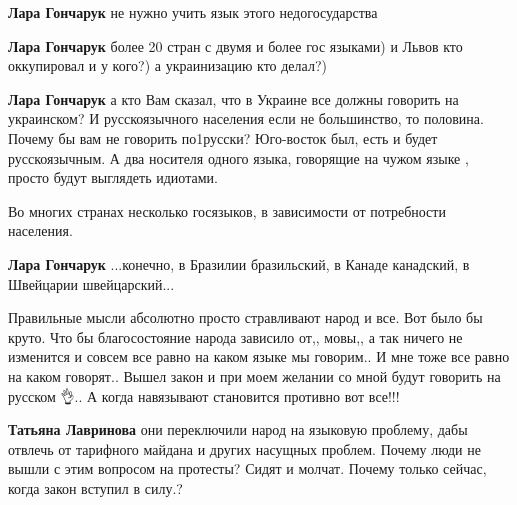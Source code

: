 \begin{itemize}
\begin{itemize}

\textbf{Лара Гончарук} не нужно учить язык этого недогосударства


\textbf{Лара Гончарук} более 20 стран с двумя и более гос языками) и Львов кто
оккупировал и у кого?) а украинизацию кто делал?)


\textbf{Лара Гончарук} а кто Вам сказал, что в Украине все должны говорить на
украинском? И русскоязычного населения если не большинство, то половина. Почему
бы вам не говорить по1русски? Юго-восток был, есть и будет русскоязычным. А два
носителя одного языка, говорящие на чужом языке , просто будут выглядеть
идиотами.



Во многих странах несколько госязыков, в зависимости от потребности населения.



\textbf{Лара Гончарук} ...конечно, в Бразилии бразильский, в Канаде канадский, в Швейцарии швейцарский...

\end{itemize}



Правильные мысли абсолютно просто стравливают народ и все. Вот было бы круто.
Что бы благосостояние народа зависило от,, мовы,, а так ничего не изменится и
совсем все равно на каком языке мы говорим.. И мне тоже все равно на каком
говорят.. Вышел закон и при моем желании со мной будут говорить на русском 👌..
А когда навязывают становится противно вот все!!!

\begin{itemize}

\textbf{Татьяна Лавринова} они переключили народ на языковую проблему, дабы
отвлечь от тарифного майдана и других насущных проблем. Почему люди не вышли с
этим вопросом на протесты? Сидят и молчат. Почему только сейчас, когда закон
вступил в силу.?
\end{itemize}


\end{itemize}
